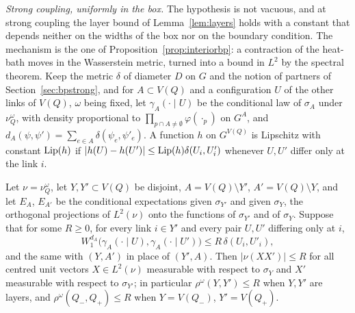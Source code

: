 \emph{Strong coupling, uniformly in the box.} The hypothesis is not
vacuous, and at strong coupling the layer bound of Lemma~\ref{lem:layers}
holds with a constant that depends neither on the widths of the box nor on
the boundary condition. The mechanism is the one of
Proposition~\ref{prop:interiorbp}: a contraction of the heat-bath moves in
the Wasserstein metric, turned into a bound in $L^2$ by the spectral
theorem. Keep the metric $\delta$ of diameter $D$ on $G$ and the notion of
partners of Section~\ref{sec:bpstrong}, and for $A\subset V(Q)$ and a
configuration $U$ of the other links of $V(Q)$, $\omega$ being fixed, let
$\gamma_A(\cdot\mid U)$ be the conditional law of $\sigma_A$ under
$\nu^\omega_Q$, with density proportional to $\prod_{p\cap A\ne\emptyset}
\varphi(\cdot_p)$ on $G^A$, and $d_A(\psi,\psi')=\sum_{e\in A}\delta(\psi_e,
\psi'_e)$. A function $h$ on $G^{V(Q)}$ is Lipschitz with constant
$\operatorname{Lip}(h)$ if $|h(U)-h(U')|\le\operatorname{Lip}(h)\delta(U_i,U'_i)$ whenever $U,U'$ differ
only at the link $i$.

\begin{lemma}\label{lem:twoproj}
Let $\nu=\nu^\omega_Q$, let $Y,Y'\subset V(Q)$ be disjoint, $A=V(Q)\setminus
Y'$, $A'=V(Q)\setminus Y$, and let $E_A$, $E_{A'}$ be the conditional
expectations given $\sigma_{Y'}$ and given $\sigma_Y$, the orthogonal
projections of $L^2(\nu)$ onto the functions of $\sigma_{Y'}$ and of
$\sigma_Y$. Suppose that for some $R\ge0$, for every link $i\in Y'$ and every
pair $U,U'$ differing only at $i$,
\[
W_1^{d_A}\bigl(\gamma_A(\cdot\mid U),\gamma_A(\cdot\mid U')\bigr)\le
R\,\delta(U_i,U'_i),
\]
and the same with $(Y,A')$ in place of $(Y',A)$. Then $|\nu(XX')|\le R$ for
all centred unit vectors $X\in L^2(\nu)$ measurable with respect to
$\sigma_Y$ and $X'$ measurable with respect to $\sigma_{Y'}$; in particular
$\rho^\omega(Y,Y')\le R$ when $Y,Y'$ are layers, and $\rho^\omega(Q_-,Q_+)
\le R$ when $Y=V(Q_-)$, $Y'=V(Q_+)$.
\end{lemma}

